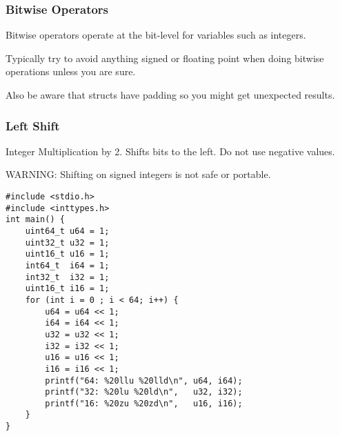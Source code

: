 \documentclass[11pt]{article}
\begin{document}
\subsubsection{Bitwise Operators}
\label{sec:org4f8e89f}

Bitwise operators operate at the bit-level for variables such as integers.

Typically try to avoid anything signed or floating point when doing
bitwise operations unless you are sure.

Also be aware that structs have padding so you might get unexpected
results.

\subsubsection{Left Shift}
\label{sec:org5975889}

Integer Multiplication by 2. Shifts bits to the left. Do not use negative values.

WARNING: Shifting on signed integers is not safe or portable.


\begin{verbatim}
#include <stdio.h>
#include <inttypes.h>
int main() {
    uint64_t u64 = 1;
    uint32_t u32 = 1;
    uint16_t u16 = 1;
    int64_t  i64 = 1;
    int32_t  i32 = 1;
    uint16_t i16 = 1;
    for (int i = 0 ; i < 64; i++) {
        u64 = u64 << 1;
        i64 = i64 << 1;
        u32 = u32 << 1;
        i32 = i32 << 1;
        u16 = u16 << 1;
        i16 = i16 << 1;
        printf("64: %20llu %20lld\n", u64, i64);
        printf("32: %20lu %20ld\n",   u32, i32);
        printf("16: %20zu %20zd\n",   u16, i16);
    }
}
\end{verbatim}
\end{document}
